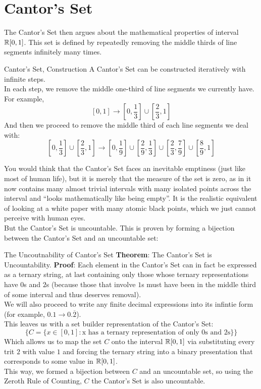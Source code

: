 \section{Cantor's Set}
The Cantor's Set then argues about the mathematical properties of interval $\mathbb{R}[0, 1]$. This set is defined by repeatedly removing the middle thirds of line segments infinitely many times.
\begin{ln-define}{Cantor's Set, Construction}{}
    A Cantor's Set can be constructed iteratively with infinite steps. \\
    In each step, we remove the middle one-third of line segments we currently have. For example,
    \[[0, 1] \rightarrow [0, \frac{1}{3}] \cup [\frac{2}{3}, 1]\]
    And then we proceed to remove the middle third of each line segments we deal with:
    \[[0, \frac{1}{3}] \cup [\frac{2}{3}, 1] \rightarrow [0, \frac{1}{9}] \cup [\frac{2}{9}, \frac{1}{3}] \cup [\frac{2}{3}, \frac{7}{9}] \cup [\frac{8}{9}, 1]\]
\end{ln-define}
You would think that the Cantor's Set faces an inevitable emptiness (just like most of human life), but it is merely that the measure of the set is zero, as in it now contains many almost trivial intervals with many isolated points across the interval and ``looks mathematically like being empty''. It is the realistic equivalent of looking at a white paper with many atomic black points, which we just cannot perceive with human eyes. \\
But the Cantor's Set is uncountable. This is proven by forming a bijection between the Cantor's Set and an uncountable set:
\begin{ln-theorem}{The Uncoutnability of Cantor's Set}{}
    \textbf{Theorem}: The Cantor's Set is Uncountability.
    \tcblower
    \textbf{Proof}: Each element in the Cantor's Set can in fact be expressed as a ternary string, at last containing only those whose ternary representations have $0$s and $2$s (because those that involve $1$s must have been in the middle third of some interval and thus deserves removal). \\
    We will also proceed to write any finite decimal expressions into its infintie form (for example, $0.1 \rightarrow 0.\overline{2}$). \\
    This leaves us with a set builder representation of the Cantor's Set:
    \[
        \{C = \{x \in [0, 1]: \text{x has a ternary representation of only 0s and 2s}\}\}
    \]
    Which allows us to map the set $C$ onto the interval $\mathbb{R}[0, 1]$ via substituting every trit $2$ with value $1$ and forcing the ternary string into a binary presentation that corresponds to some value in $\mathbb{R}[0, 1]$. \\
    This way, we formed a bijection between $C$ and an uncountable set, so using the Zeroth Rule of Counting, $C$ the Cantor's Set is also uncountable.
\end{ln-theorem}

